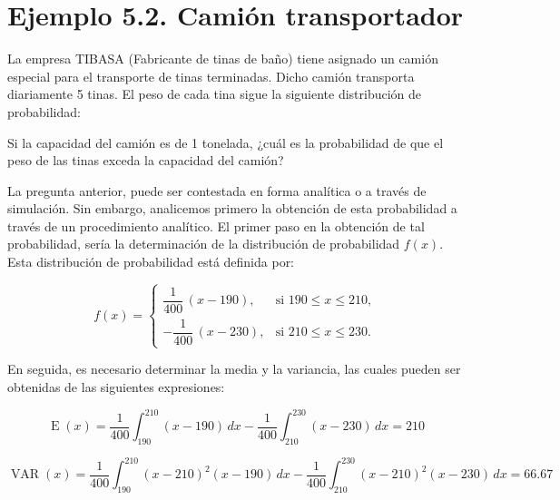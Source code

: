 \documentclass[11pt,letterpaper]{report}
\newcommand{\E}{\operatorname{E}}
\newcommand{\VAR}{\operatorname{VAR}}
\begin{document}
\section*{Ejemplo 5.2. Camión transportador}

La empresa TIBASA (Fabricante de tinas de baño) tiene asignado un camión
especial para el transporte de tinas terminadas. Dicho camión transporta
diariamente 5 tinas. El peso de cada tina sigue la siguiente distribución
de probabilidad:

\begin{figure}[H]
\centering
{}
\end{figure}

Si la capacidad del camión es de 1 tonelada, ¿cuál es la probabilidad de
que el peso de las tinas exceda la capacidad del camión?

La pregunta anterior, puede ser contestada en forma analítica o a través
de simulación. Sin embargo, analicemos primero la obtención de esta
probabilidad a través de un procedimiento analítico. El primer paso en la
obtención de tal probabilidad, sería la determinación de la distribución
de probabilidad $f(x)$. Esta distribución de probabilidad está definida
por:

\[
f(x)=
\begin{cases}
\dfrac{1}{400}\,(x-190), & \text{si } 190 \le x \le 210,\\[10pt]
-\dfrac{1}{400}\,(x-230), & \text{si } 210 \le x \le 230.
\end{cases}
\]

En seguida, es necesario determinar la media y la variancia, las cuales
pueden ser obtenidas de las siguientes expresiones:

\[
\E(x)=\frac{1}{400}\int_{190}^{210}(x-190)\,dx-\frac{1}{400}\int_{210}^{230}(x-230)\,dx = 210
\]

\[
\VAR(x)=\frac{1}{400}\int_{190}^{210}(x-210)^{2}(x-190)\,dx-\frac{1}{400}\int_{210}^{230}(x-210)^{2}(x-230)\,dx = 66.67
\]
\end{document}
